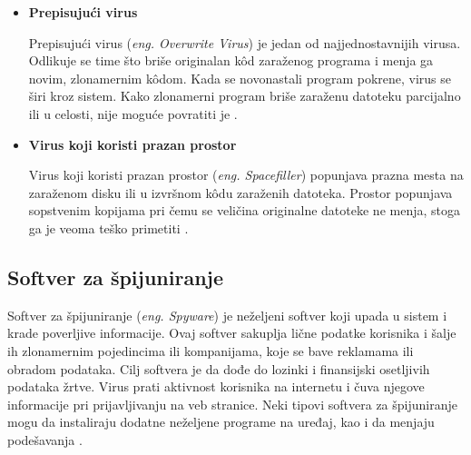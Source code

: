 \documentclass[a4paper]{article}
\begin{document}
\begin{itemize}
\item \textbf{Prepisujući virus}

Prepisujući virus (\textit{eng. Overwrite Virus}) je jedan od najjednostavnijih virusa. Odlikuje se time što briše originalan kôd zaraženog programa i menja ga novim, zlonamernim kôdom. Kada se novonastali program pokrene, virus se širi kroz sistem. Kako zlonamerni program briše zaraženu datoteku parcijalno ili u celosti, nije moguće povratiti je \cite{overwriting_virus}.

\item \textbf{Virus koji koristi prazan prostor}

Virus koji koristi prazan prostor (\textit{eng. Spacefiller}) popunjava prazna mesta na zaraženom disku ili u izvršnom kôdu zaraženih datoteka. Prostor popunjava sopstvenim kopijama pri čemu se veličina originalne datoteke ne menja, stoga ga je veoma teško primetiti \cite{spacefiller_virus}.

\end{itemize}


\subsection{Softver za špijuniranje}
\label{spyware}
Softver za špijuniranje (\textit{eng. Spyware}) je neželjeni softver koji upada u sistem i krade poverljive informacije. Ovaj softver sakuplja lične podatke korisnika i šalje ih zlonamernim pojedincima ili kompanijama, koje se bave reklamama ili obradom podataka. Cilj softvera je da dođe do lozinki i finansijski osetljivih podataka žrtve. Virus prati aktivnost korisnika na internetu i čuva njegove informacije pri prijavljivanju na veb stranice. Neki tipovi softvera za špijuniranje mogu da instaliraju dodatne neželjene programe na uređaj, kao i da menjaju podešavanja \cite{spyware}.
\end{document}

